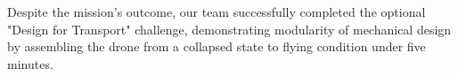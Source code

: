 \pagebreak
Despite the mission's outcome, our team successfully completed the optional "Design for Transport" challenge, demonstrating modularity of mechanical design by assembling the drone from a collapsed state to flying condition under five minutes.


